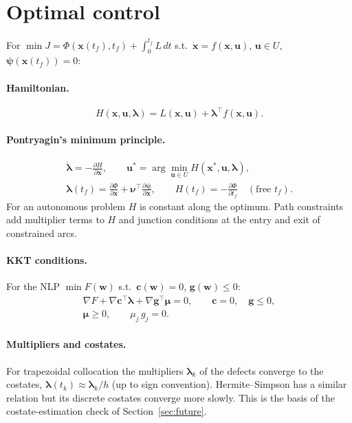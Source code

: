 \documentclass[11pt,a4paper]{article}
\begin{document}
\section{Optimal control}\label{app:ocp}
For $\min J = \Phi(\mathbf{x}(t_f), t_f) + \int_0^{t_f} L\,dt$ s.t.\ $\dot{\mathbf{x}} = f(\mathbf{x}, \mathbf{u})$,
$\mathbf{u} \in U$, $\boldsymbol\psi(\mathbf{x}(t_f)) = 0$:

\paragraph{Hamiltonian.}
\begin{equation}
H(\mathbf{x}, \mathbf{u}, \boldsymbol\lambda) = L(\mathbf{x}, \mathbf{u}) + \boldsymbol\lambda^\top f(\mathbf{x}, \mathbf{u}).
\end{equation}

\paragraph{Pontryagin's minimum principle.}
\begin{gather}
\dot{\boldsymbol\lambda} = -\frac{\partial H}{\partial \mathbf{x}}, \qquad
\mathbf{u}^* = \arg\min_{\mathbf{u} \in U} H(\mathbf{x}^*, \mathbf{u}, \boldsymbol\lambda), \\
\boldsymbol\lambda(t_f) = \frac{\partial \Phi}{\partial \mathbf{x}} + \boldsymbol\nu^\top \frac{\partial \boldsymbol\psi}{\partial \mathbf{x}}, \qquad
H(t_f) = -\frac{\partial \Phi}{\partial t_f} \quad (\text{free } t_f).
\end{gather}
For an autonomous problem $H$ is constant along the optimum. Path constraints add multiplier terms to
$H$ and junction conditions at the entry and exit of constrained arcs.

\paragraph{KKT conditions.} For the NLP $\min F(\mathbf{w})$ s.t.\ $\mathbf{c}(\mathbf{w}) = 0$, $\mathbf{g}(\mathbf{w}) \le 0$:
\begin{gather}
\nabla F + \nabla\mathbf{c}^\top \boldsymbol\lambda + \nabla\mathbf{g}^\top \boldsymbol\mu = 0, \qquad
\mathbf{c} = 0, \quad \mathbf{g} \le 0, \\
\boldsymbol\mu \ge 0, \qquad \mu_j\, g_j = 0 .
\end{gather}

\paragraph{Multipliers and costates.} For trapezoidal collocation the multipliers $\boldsymbol\lambda_k$
of the defects converge to the costates, $\boldsymbol\lambda(t_k) \approx \boldsymbol\lambda_k / h$
(up to sign convention). Hermite--Simpson has a similar relation but its discrete costates converge
more slowly. This is the basis of the costate-estimation check of Section~\ref{sec:future}.
\end{document}
